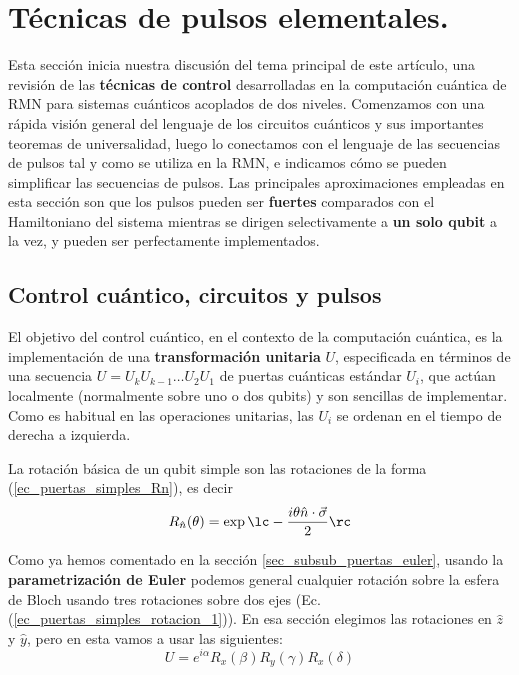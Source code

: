 	\section{Técnicas de pulsos elementales.} \label{sec_sub_Harware_NMR_pulsos} 

Esta sección inicia nuestra discusión del tema principal de este artículo, una revisión de las \textbf{técnicas de control} desarrolladas en la computación cuántica de RMN para sistemas cuánticos acoplados de dos niveles. Comenzamos con una rápida visión general del lenguaje de los circuitos cuánticos y sus importantes teoremas de universalidad, luego lo conectamos con el lenguaje de las secuencias de pulsos tal y como se utiliza en la RMN, e indicamos cómo se pueden simplificar las secuencias de pulsos. Las principales aproximaciones empleadas en esta sección son que los pulsos pueden ser \textbf{fuertes} comparados con el Hamiltoniano del sistema mientras se dirigen selectivamente a \textbf{un solo qubit} a la vez, y pueden ser perfectamente implementados. 

		\subsection{Control cuántico, circuitos y pulsos}

El objetivo del control cuántico, en el contexto de la computación cuántica, es la implementación de una \textbf{transformación unitaria} $U$, especificada en términos de una secuencia $U = U_k U_{k-1} \dots U_2 U_1$ de puertas cuánticas estándar $U_i$, que actúan localmente (normalmente sobre uno o dos qubits) y son sencillas de implementar. Como es habitual en las operaciones unitarias, las $U_i$ se ordenan en el tiempo de derecha a izquierda.


La rotación básica de un qubit simple son las rotaciones de la forma (\ref{ec_puertas_simples_Rn}), es decir
\begin{equation}
R_{\hat{n}} (\theta) = \exp \lc - \frac{i \theta \hat{n} \cdot \vec{\sigma}}{2} \rc
\end{equation}

Como ya hemos comentado en la sección \ref{sec_subsub_puertas_euler}, usando la \textbf{parametrización de Euler}  podemos general cualquier rotación sobre la esfera de Bloch usando tres rotaciones sobre dos ejes (Ec. (\ref{ec_puertas_simples_rotacion_1})). En esa sección elegimos las rotaciones en $\hat{z}$ y $\hat{y}$, pero en esta vamos a usar las siguientes:
	\begin{equation}
	U = e^{i \alpha} R_x(\beta) R_y (\gamma) R_x (\delta)
	\end{equation}

